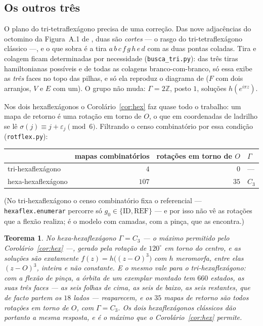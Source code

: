 \documentclass[11pt,a4paper]{article}
\theoremstyle{plain}
\newtheorem{teorema}{Teorema}[section]
\theoremstyle{definition}
\theoremstyle{remark}
\newcommand{\Z}{\mathbb{Z}}
\begin{document}
\subsection*{Os outros três}

O plano do tri-tetraflexágono precisa de uma correção. Das nove adjacências do
octomino da Figura~A.1 de \cite{manual}, duas são \emph{cortes} --- o rasgo do
tri-tetraflexágono clássico ---, e o que sobra é a tira
$a\,b\,c\,f\,g\,h\,e\,d$ com as duas pontas coladas. Tira e colagem ficam
determinadas por necessidade (\texttt{busca\_tri.py}): das três tiras
hamiltonianas possíveis e de todas as colagens branco-com-branco, só essa
exibe as \emph{três} faces no topo das pilhas, e só ela reproduz o diagrama
de \cite{enimar} ($F$ com dois arranjos, $V$ e $E$ com um). O grupo não muda:
$\Gamma=2\Z$, posto $1$, soluções $h(e^{i\pi z})$.

Nos dois hexaflexágonos o Corolário~\ref{cor:hex} faz quase todo o trabalho:
um mapa de retorno é uma rotação em torno de $O$, o que em coordenadas de
ladrilho se lê $\sigma(j)\equiv j+\varepsilon_j\pmod 6$. Filtrando o censo
combinatório por essa condição (\texttt{rotflex.py}):

\begin{center}
\renewcommand{\arraystretch}{1.15}
\begin{tabular}{lrrl}
\toprule
& mapas combinatórios & rotações em torno de $O$ & $\Gamma$\\
\midrule
tri-hexaflexágono  & $4$   & $0$  & --- \\
hexa-hexaflexágono & $107$ & $35$ & $C_3$\\
\bottomrule
\end{tabular}
\end{center}

(No tri-hexaflexágono o censo combinatório fixa o referencial --- \texttt{hexaflex.enumerar}
percorre só $g_0\in\{\mathrm{ID},\mathrm{REF}\}$ --- e por isso não vê as
rotações que a flexão realiza; é o modelo com camadas, com a pinça, que as
encontra.)

\begin{teorema}\label{thm:hexaflex}
No hexa-hexaflexágono $\Gamma=C_3$ --- o máximo permitido pelo
Corolário~\ref{cor:hex} ---, gerado pela rotação de $120^\circ$ em torno do
centro, e as soluções são exatamente $f(z)=h\big((z-O)^3\big)$ com $h$
meromorfa, entre elas $(z-O)^3$, inteira e não constante. E o mesmo vale para o
tri-hexaflexágono: com a flexão de pinça, a órbita de um exemplar montado tem
$660$ estados, as suas três faces --- as seis folhas de cima, as seis de
baixo, as seis restantes, que de facto partem os $18$ lados --- reaparecem, e
os $35$ mapas de retorno são todos rotações em torno de $O$, com
$\Gamma=C_3$. Os dois hexaflexágonos clássicos dão portanto a \emph{mesma}
resposta, e é o máximo que o Corolário~\ref{cor:hex} permite.
\end{teorema}
\end{document}
